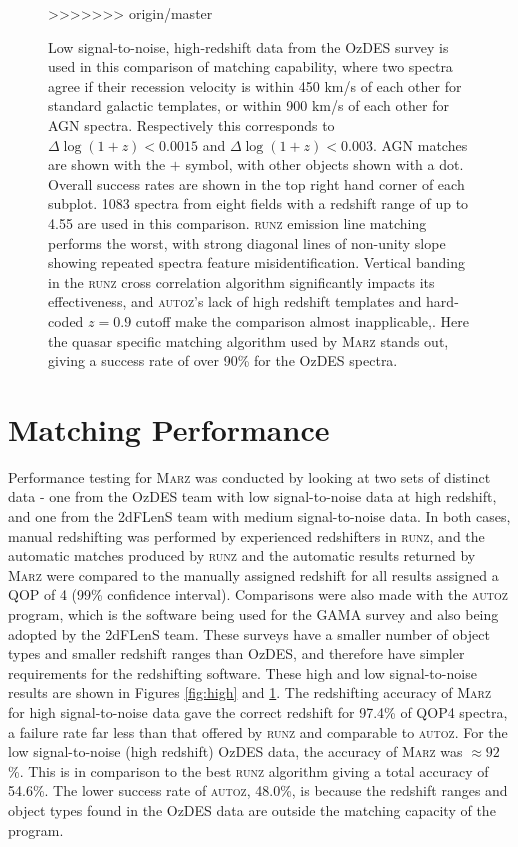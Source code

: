 \documentclass[iop]{emulateapj}
\newcommand{\runz}{\textsc{runz}}
\newcommand{\autoz}{\textsc{autoz}}
\newcommand{\marz}{\textsc{Marz}}
\begin{document}
\begin{figure}[t]
\caption{Low signal-to-noise, high-redshift data from the OzDES survey is used in this comparison of matching capability, where two spectra agree if their recession velocity is within 450 km/s of each other for standard galactic templates, or within 900 km/s of each other for AGN spectra. Respectively this corresponds to $\Delta \log(1+z) < 0.0015$ and $\Delta \log(1+z) < 0.003$. AGN matches are shown with the $+$ symbol, with other objects shown with a dot. Overall success rates are shown in the top right hand corner of each subplot. 1083 spectra from eight fields with a redshift range of up to 4.55 are used in this comparison. \runz{} emission line matching performs the worst, with strong diagonal lines of non-unity slope showing repeated spectra feature misidentification. Vertical banding in the \runz{} cross correlation algorithm significantly impacts its effectiveness, and \autoz{}'s lack of high redshift templates and hard-coded $z=0.9$ cutoff make the comparison almost inapplicable,. Here the quasar specific matching algorithm used by \marz{} stands out, giving a success rate of over 90\% for the OzDES spectra.}
>>>>>>> origin/master
\label{fig:low}
\end{figure}
















\section{Matching Performance}

Performance testing for \marz{} was conducted by looking at two sets of distinct data - one from the OzDES team with low signal-to-noise data at high redshift, and one from the 2dFLenS team with medium signal-to-noise data. In both cases, manual redshifting was performed by experienced redshifters in \runz{}, and the automatic matches produced by \runz{} and the automatic results returned by \marz{} were compared to the manually assigned redshift for all results assigned a QOP of 4 (99\% confidence interval). Comparisons were also made with the \autoz{} program, which is the software being used for the GAMA survey and also being adopted by the 2dFLenS team. These surveys have a smaller number of object types and smaller redshift ranges than OzDES, and therefore have simpler requirements for the redshifting software. These high and low signal-to-noise results are shown in Figures \ref{fig:high} and \ref{fig:low}. The redshifting accuracy of \marz{} for high signal-to-noise data gave the correct redshift for 97.4\% of QOP4 spectra, a failure rate far less than that offered by \runz{} and comparable to \autoz{}. For the low signal-to-noise (high redshift) OzDES data, the accuracy of \marz{} was $\approx 92$\%. This is in comparison to the best \runz{} algorithm giving a total accuracy of 54.6\%. The lower success rate of \autoz, 48.0\%, is because the redshift ranges and object types found in the OzDES data are outside the matching capacity of the program.\\
\end{document}
